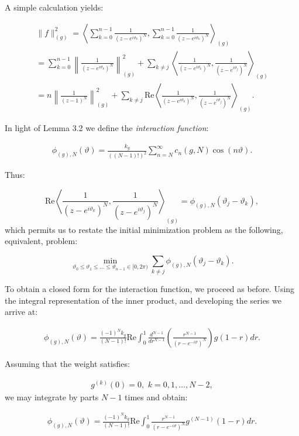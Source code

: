 \documentclass{amsart}[11pt]
\newcommand{\vth}{\vartheta}
\theoremstyle{definition}
\begin{document}
A simple calculation yields:

\begin{gather*}
\| f \|^2_{(g)} =
\left\langle \sum_{k=0}^{n-1} \frac{1}{(z - e^{i\vth_k})^N}, \sum_{k=0}^{n-1} \frac{1}{(z - e^{i\vth_k})^N} \right\rangle_{(g)} \\ = \sum_{k=0}^{n-1} \left\| \frac{1}{(z - e^{i\vth_k})^N} \right\|^2_{(g)}
+ \sum_{k \neq j} \left\langle \frac{1}{(z - e^{i\vth_k})^N}, \frac{1}{(z - e^{i\vth_j})^N} \right\rangle_{(g)} \\
= n \left\| \frac{1}{(z-1)^N}\right\|^2_{(g)} + \sum_{k \neq j} \text{Re}\left\langle \frac{1}{(z - e^{i\vth_k})^N}, \frac{1}{(z - e^{i\vth_j})^N} \right\rangle_{(g)}.
\end{gather*}

In light of Lemma 3.2 we define the \textit{interaction function}:

\begin{gather}
\phi_{(g),N} (\vth) = \frac{k_g}{((N-1)!)^2} \sum_{n=N}^{\infty} c_n(g,N)\cos(n\vth).
\end{gather}

Thus:

\[
\text{Re}\left\langle \frac{1}{(z - e^{i\vth_k})^N}, \frac{1}{(z - e^{i\vth_j})^N} \right\rangle_{(g)} = \phi_{(g),N} (\vth_j - \vth_k),
\]
which permits us to restate the initial minimization problem as the following, equivalent, problem:

\[
\min_{\vth_0 \leq \vth_1 \leq \dots \leq \vth_{n-1} \in [0,2\pi)}
\sum_{k \neq j} \phi_{(g),N} (\vth_j - \vth_k).
\]

To obtain a closed form for the interaction function, we proceed as before. Using the integral representation of the inner product, and developing the series we arrive at:

\begin{gather*}
\phi_{(g),N} (\vth) =
\frac{(-1)^N k_g}{ (N-1)!} \text{Re}\int_{0}^{1} \frac{d^{N-1}}{dr^{N-1}} \left( \frac{r^{N-1}}{(r - e^{-i\vth})^N} \right) g(1 - r) dr.
\end{gather*}

Assuming that the weight satisfies:

\begin{gather}
g^{(k)}(0) = 0,\,\,  k = 0, 1, \dots, N-2,
\end{gather}
we may  integrate by parts \( N-1 \) times and obtain:

\begin{gather*}
\phi_{(g),N} (\vth) =
\frac{(-1)^N k_g}{ (N-1)!} \text{Re}\int_{0}^{1} \frac{r^{N-1}}{(r - e^{-i\vth})^N} g^{(N-1)}(1 - r) dr.
\end{gather*}
\end{document}
